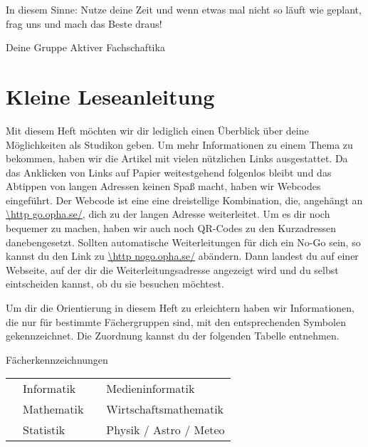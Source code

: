 In diesem Sinne: Nutze deine Zeit und wenn etwas mal nicht so läuft wie geplant, frag uns und mach das Beste draus!

Deine Gruppe Aktiver Fachschaftika

\chapter{Kleine Leseanleitung}

Mit diesem Heft möchten wir dir lediglich einen Überblick über deine Möglichkeiten als Studikon geben. Um mehr Informationen zu einem Thema zu bekommen, haben wir die Artikel mit vielen nützlichen Links ausgestattet. Da das Anklicken von Links auf Papier weitestgehend folgenlos bleibt und das Abtippen von langen Adressen keinen Spaß macht, haben wir Webcodes eingeführt. Der Webcode ist eine eine dreistellige Kombination, die, angehängt an \url{\http go.opha.se/}, dich zu der langen Adresse weiterleitet. Um es dir noch bequemer zu machen, haben wir auch noch QR-Codes zu den Kurzadressen danebengesetzt. Sollten automatische Weiterleitungen für dich ein No-Go sein, so kannst du den Link zu \url{\http nogo.opha.se/} abändern. Dann landest du auf einer Webseite, auf der dir die Weiterleitungsadresse angezeigt wird und du selbst eintscheiden kannst, ob du sie besuchen möchtest.

Um dir die Orientierung in diesem Heft zu erleichtern haben wir Informationen, die nur für bestimmte Fächergruppen sind, mit den entsprechenden Symbolen gekennzeichnet. Die Zuordnung kannst du der folgenden Tabelle entnehmen.

\begin{table*}[h]
	\centering
	Fächerkennzeichnungen
	\begin{tabular}{ l l l l }
		\subjectI & Informatik  & \subjectMI & Medieninformatik \\[1.5mm]
		\subjectM & Mathematik   & \subjectW  & Wirtschaftsmathematik \\[1.5mm]
		\subjectS & Statistik    & \subjectP  & Physik / Astro / Meteo
	\end{tabular}
\end{table*}
